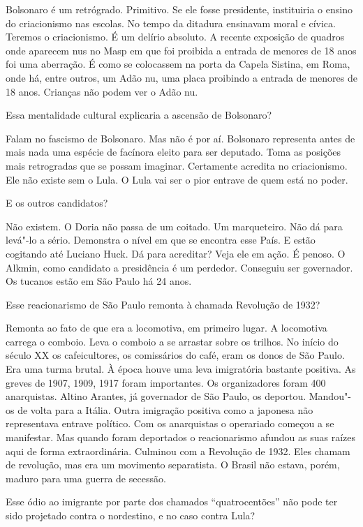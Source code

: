 \falaM Bolsonaro é um retrógrado. Primitivo. Se ele fosse presidente,
instituiria o ensino do criacionismo nas escolas. No tempo da ditadura
ensinavam moral e cívica. Teremos o criacionismo. É um delírio absoluto.
A recente exposição de quadros onde aparecem nus no Masp em que foi
proibida a entrada de menores de 18 anos foi uma aberração. É como se
colocassem na porta da Capela Sistina, em Roma, onde há, entre outros,
um Adão nu, uma placa proibindo a entrada de menores de 18 anos.
Crianças não podem ver o Adão nu.

\falaG Essa mentalidade cultural explicaria a ascensão de Bolsonaro?

\falaM Falam no fascismo de Bolsonaro. Mas não é por aí. Bolsonaro
representa antes de mais nada uma espécie de facínora eleito para ser
deputado. Toma as posições mais retrogradas que se possam imaginar.
Certamente acredita no criacionismo. Ele não existe sem o Lula. O Lula
vai ser o pior entrave de quem está no poder.

\falaG E os outros candidatos?

\falaM Não existem. O Doria não passa de um coitado. Um marqueteiro. Não dá
para levá"-lo a sério. Demonstra o nível em que se encontra esse País. E
estão cogitando até Luciano Huck. Dá para acreditar? Veja ele em ação. É
penoso. O Alkmin, como candidato a presidência é um perdedor. Conseguiu
ser governador. Os tucanos estão em São Paulo há 24 anos.

\falaG Esse reacionarismo de São Paulo remonta à chamada Revolução de 1932?

\falaM Remonta ao fato de que era a locomotiva, em primeiro lugar. A
locomotiva carrega o comboio. Leva o comboio a se arrastar sobre os
trilhos. No início do século XX os cafeicultores, os comissários do
café, eram os donos de São Paulo. Era uma turma brutal. À época houve
uma leva imigratória bastante positiva. As greves de 1907, 1909, 1917
foram importantes. Os organizadores foram 400 anarquistas. Altino
Arantes, já governador de São Paulo, os deportou. Mandou"-os de volta
para a Itália. Outra imigração positiva como a japonesa não representava
entrave político. Com os anarquistas o operariado começou a se
manifestar. Mas quando foram deportados o reacionarismo afundou as suas
raízes aqui de forma extraordinária. Culminou com a Revolução de 1932.
Eles chamam de revolução, mas era um movimento separatista. O Brasil não
estava, porém, maduro para uma guerra de secessão.

\falaG Esse ódio ao imigrante por parte dos chamados ``quatrocentões'' não
pode ter sido projetado contra o nordestino, e no caso contra Lula?


